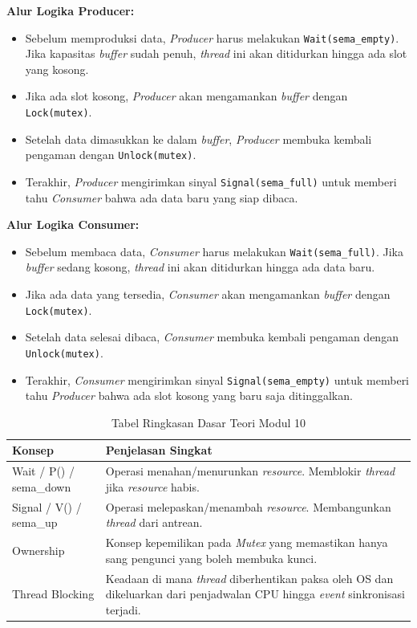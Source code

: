 \noindent \textbf{Alur Logika Producer:}
\begin{itemize}
	\item Sebelum memproduksi data, \textit{Producer} harus melakukan \texttt{Wait(sema\_empty)}. Jika kapasitas \textit{buffer} sudah penuh, \textit{thread} ini akan ditidurkan hingga ada slot yang kosong.
	\item Jika ada slot kosong, \textit{Producer} akan mengamankan \textit{buffer} dengan \texttt{Lock(mutex)}.
	\item Setelah data dimasukkan ke dalam \textit{buffer}, \textit{Producer} membuka kembali pengaman dengan \texttt{Unlock(mutex)}.
	\item Terakhir, \textit{Producer} mengirimkan sinyal \texttt{Signal(sema\_full)} untuk memberi tahu \textit{Consumer} bahwa ada data baru yang siap dibaca.
\end{itemize}

\noindent \textbf{Alur Logika Consumer:}
\begin{itemize}
	\item Sebelum membaca data, \textit{Consumer} harus melakukan \texttt{Wait(sema\_full)}. Jika \textit{buffer} sedang kosong, \textit{thread} ini akan ditidurkan hingga ada data baru.
	\item Jika ada data yang tersedia, \textit{Consumer} akan mengamankan \textit{buffer} dengan \texttt{Lock(mutex)}.
	\item Setelah data selesai dibaca, \textit{Consumer} membuka kembali pengaman dengan \texttt{Unlock(mutex)}.
	\item Terakhir, \textit{Consumer} mengirimkan sinyal \texttt{Signal(sema\_empty)} untuk memberi tahu \textit{Producer} bahwa ada slot kosong yang baru saja ditinggalkan.
\end{itemize}

\begin{table}[h]
	\caption{Tabel Ringkasan Dasar Teori Modul 10}
	\label{tab:m10-dasar-teori}
	\centering
	\begin{tabulary}{\textwidth}{|L|L|}
		\hline
		\textbf{Konsep} & \textbf{Penjelasan Singkat} \\ \hline
		Wait / P() / sema\_down
		& Operasi menahan/menurunkan \textit{resource}. Memblokir \textit{thread} jika \textit{resource} habis. \\ \hline
		Signal / V() / sema\_up
		& Operasi melepaskan/menambah \textit{resource}. Membangunkan \textit{thread} dari antrean. \\ \hline
		Ownership
		& Konsep kepemilikan pada \textit{Mutex} yang memastikan hanya sang pengunci yang boleh membuka kunci. \\ \hline
		Thread Blocking
		& Keadaan di mana \textit{thread} diberhentikan paksa oleh OS dan dikeluarkan dari penjadwalan CPU hingga \textit{event} sinkronisasi terjadi. \\ \hline
	\end{tabulary}
\end{table}


